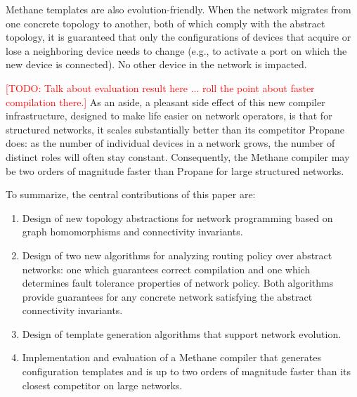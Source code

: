 \documentclass[numbers, 10pt, preprint]{sigplanconf}
\newcommand{\todo}[1]{\textcolor{red}{[TODO: #1]}}
\newcommand{\sysname}{{\small \sf Methane}\xspace}
\newcommand{\propane}{{\small \sf Propane}\xspace}
\begin{document}
\sysname templates are also evolution-friendly. When the network migrates from one concrete topology to another, both of which comply with the abstract topology, it is guaranteed that only the configurations of devices that acquire or lose a neighboring device needs to change (e.g., to activate a port on which the new device is connected).  No other device in the network is impacted.

\todo{Talk about evaluation result here ... roll the point about faster compilation there.}
As an aside, a pleasant side effect of this new compiler
infrastructure, designed to make life easier on network operators, is
that for structured networks, it scales substantially better than its
competitor \propane does: as the number of individual devices in a
network grows, the number of distinct roles will often stay constant.
Consequently, the \sysname compiler may be two orders of magnitude
faster than \propane for large structured networks.

To summarize, the central contributions of this paper are:

\begin{enumerate}
\item Design of new topology abstractions for network programming
based on graph homomorphisms and connectivity invariants.
\item Design of two new algorithms for analyzing routing policy over
abstract networks: one which
guarantees correct compilation and one which determines fault tolerance
properties of network policy.  Both algorithms provide guarantees for any
concrete network satisfying the abstract connectivity invariants.
\item Design of template generation algorithms that support network
evolution.
\item Implementation and evaluation of a \sysname compiler that generates
configuration templates and is up to two orders of magnitude faster
than its closest competitor on large networks.
\end{enumerate}


\end{document}
